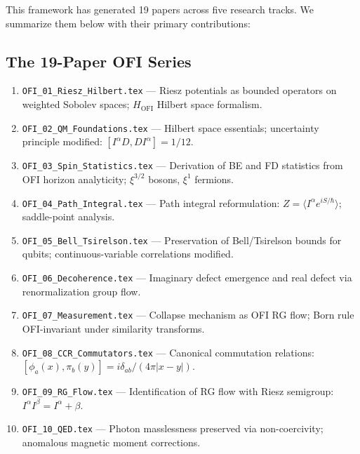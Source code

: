 \documentclass[12pt,a4paper]{article}
\theoremstyle{definition}
\newcommand{\Ialpha}{I^{\alpha}}
\newcommand{\Ibeta}{I^{\beta}}
\newcommand{\OFI}{\text{OFI}}
\begin{document}
This framework has generated 19 papers across five research tracks. We summarize them below with their primary contributions:

\subsection{The 19-Paper OFI Series}

\begin{enumerate}
\item \texttt{OFI\_01\_Riesz\_Hilbert.tex} — Riesz potentials as bounded operators on weighted Sobolev spaces; $H_{\OFI}$ Hilbert space formalism.

\item \texttt{OFI\_02\_QM\_Foundations.tex} — Hilbert space essentials; uncertainty principle modified: $[\Ialpha D, D\Ialpha] = 1/12$.

\item \texttt{OFI\_03\_Spin\_Statistics.tex} — Derivation of BE and FD statistics from OFI horizon analyticity; $\xi^{3/2}$ bosons, $\xi^1$ fermions.

\item \texttt{OFI\_04\_Path\_Integral.tex} — Path integral reformulation: $Z = \langle \Ialpha e^{iS/\hbar} \rangle$; saddle-point analysis.

\item \texttt{OFI\_05\_Bell\_Tsirelson.tex} — Preservation of Bell/Tsirelson bounds for qubits; continuous-variable correlations modified.

\item \texttt{OFI\_06\_Decoherence.tex} — Imaginary defect emergence and real defect via renormalization group flow.

\item \texttt{OFI\_07\_Measurement.tex} — Collapse mechanism as OFI RG flow; Born rule OFI-invariant under similarity transforms.

\item \texttt{OFI\_08\_CCR\_Commutators.tex} — Canonical commutation relations: $[\phi_a(x), \pi_b(y)] = i\delta_{ab}/(4\pi|x-y|)$.

\item \texttt{OFI\_09\_RG\_Flow.tex} — Identification of RG flow with Riesz semigroup: $\Ialpha \Ibeta = \Ialpha+\beta$.

\item \texttt{OFI\_10\_QED.tex} — Photon masslessness preserved via non-coercivity; anomalous magnetic moment corrections.


\end{enumerate}
\end{document}
